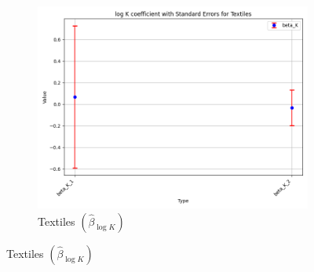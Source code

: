 \documentclass{article}
\begin{document}
\begin{figure}[ht!]
\begin{subfigure}[t]{0.32\textwidth}
        \centering
        \includegraphics[width=\textwidth]{figure/empirical_stat_mixture_kmshare_ciiu_beta_logK_with_error_bars_Textiles.png}
        \caption{Textiles $(\hat{\beta}_{\log K})$}
    \end{subfigure}


\end{figure}
\end{document}
